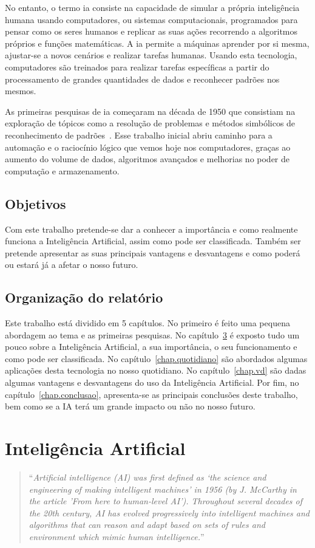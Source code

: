 \documentclass{report}
\begin{document}
No entanto, o termo \ac{ia} consiste na capacidade de simular a própria inteligência humana usando computadores, ou sistemas computacionais, programados para pensar como os seres humanos e replicar as suas ações recorrendo a algoritmos próprios e funções matemáticas.
A \ac{ia} permite a máquinas aprender por si mesma, ajustar-se a novos cenários e realizar tarefas humanas.
Usando esta tecnologia, computadores são treinados para realizar tarefas específicas a partir do processamento de grandes quantidades de dados e reconhecer padrões nos mesmos.

As primeiras pesquisas de \ac{ia} começaram na década de 1950
que consistiam na exploração de tópicos como a resolução de problemas e métodos simbólicos de reconhecimento de padrões~\cite{Zadeh:2008}.
Esse trabalho inicial abriu caminho para a automação e o raciocínio lógico
que vemos hoje nos computadores, graças ao aumento do volume de dados,
algoritmos avançados e melhorias no poder de computação e armazenamento.

\section{Objetivos}
Com este trabalho pretende-se dar a conhecer a importância e como realmente funciona a Inteligência Artificial, assim como pode ser classificada. Também ser pretende apresentar as suas principais vantagens e desvantagens e como poderá ou estará já a afetar o nosso futuro.

\section{Organização do relatório}
Este trabalho está dividido em 5 capítulos. No primeiro é feito uma pequena abordagem ao tema e as primeiras pesquisas. No capítulo~\ref{chap.IA} é exposto tudo um pouco sobre a Inteligência Artificial, a sua importância, o seu funcionamento e como pode ser classificada. No capítulo~\ref{chap.quotidiano} são abordados algumas aplicações desta tecnologia no nosso quotidiano. No capítulo~\ref{chap.vd} são dadas algumas vantagens e desvantagens do uso da Inteligência Artificial. Por fim, no capítulo~\ref{chap.conclusao}, apresenta-se as principais conclusões deste trabalho, bem como se a IA terá um grande impacto ou não no nosso futuro.

\chapter{Inteligência Artificial}
\label{chap.IA}
\begin{quote}
    ``\emph{Artificial intelligence (AI) was first defined as `the science and engineering of making intelligent machines' in 1956 (by J. McCarthy in the article 'From here to human-level AI'). Throughout several decades of the 20th century, AI has evolved progressively into intelligent machines and algorithms that can reason and adapt based on sets of rules and environment which mimic human intelligence.}''
\end{quote}
\end{document}
